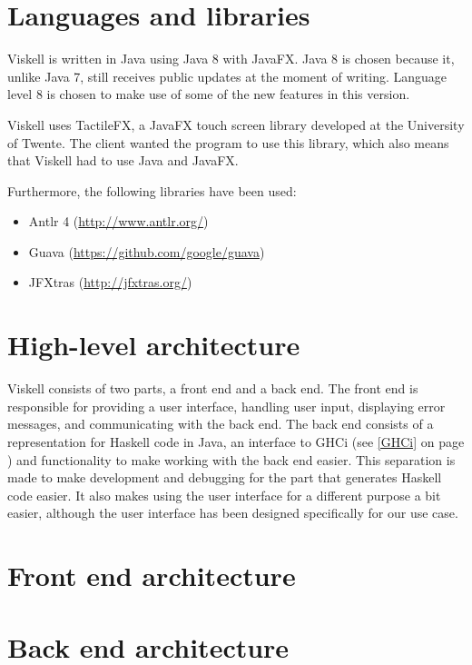 \section{Languages and libraries}

Viskell is written in Java using Java 8 with JavaFX.
Java 8 is chosen because it, unlike Java 7, still receives public updates at the moment of writing.
Language level 8 is chosen to make use of some of the new features in this version.

Viskell uses TactileFX, a JavaFX touch screen library developed at the University of Twente.
The client wanted the program to use this library, which also means that Viskell had to use Java and JavaFX.

Furthermore, the following libraries have been used:

\begin{itemize}
	\item Antlr 4 (\url{http://www.antlr.org/})
	\item Guava (\url{https://github.com/google/guava})
	\item JFXtras (\url{http://jfxtras.org/})
\end{itemize}

\section{High-level architecture}

Viskell consists of two parts, a front end and a back end.
The front end is responsible for providing a user interface, handling user input, displaying error messages, and communicating with the back end.
The back end consists of a representation for Haskell code in Java, an interface to GHCi (see \ref{GHCi} on page \pageref{GHCi}) and functionality to make working with the back end easier.
This separation is made to make development and debugging for the part that generates Haskell code easier.
It also makes using the user interface for a different purpose a bit easier, although the user interface has been designed specifically for our use case.

\section{Front end architecture}

\section{Back end architecture}

